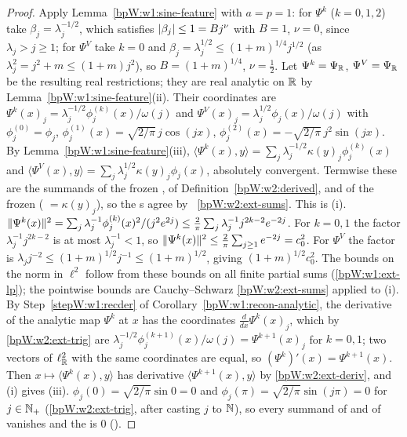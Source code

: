 \begin{proof}
\label{stepW:w2:features}
Apply Lemma~\ref{bpW:w1:sine-feature} with $a=p=1$: for $\Psi^k$ ($k=0,1,2$) take $\beta_j=\lambda_j^{-1/2}$, which
satisfies $\lvert \beta_j\rvert\le1=Bj^\nu$ with $B=1$, $\nu=0$, since $\lambda_j>j\ge1$; for $\Psi^V$ take $k=0$ and
$\beta_j=\lambda_j^{1/2}\le(1+m)^{1/4}j^{1/2}$ (as $\lambda_j^2=j^2+m\le(1+m)j^2$), so $B=(1+m)^{1/4}$, $\nu=\frac12$.
Let $\Psi^k=\Psi_{\mathbb{R}}$, $\Psi^V=\Psi_{\mathbb{R}}$ be the resulting real restrictions; they are real analytic on $\mathbb{R}$ by
Lemma~\ref{bpW:w1:sine-feature}(ii). Their coordinates are
$\Psi^k(x)_j=\lambda_j^{-1/2}\phi^{(k)}_j(x)/\omega(j)$ and $\Psi^V(x)_j=\lambda_j^{1/2}\phi_j(x)/\omega(j)$ with
$\phi^{(0)}_j=\phi_j$, $\phi^{(1)}_j(x)=\sqrt{2/\pi}\,j\cos(jx)$, $\phi^{(2)}_j(x)=-\sqrt{2/\pi}\,j^2\sin(jx)$.
\label{stepW:w2:pairing}
By Lemma~\ref{bpW:w1:sine-feature}(iii), $\langle\Psi^k(x),y\rangle=\sum_j\lambda_j^{-1/2}\kappa(y)_j\phi^{(k)}_j(x)$
and $\langle\Psi^V(x),y\rangle=\sum_j\lambda_j^{1/2}\kappa(y)_j\phi_j(x)$, absolutely convergent. Termwise these are
the summands of the frozen , of Definition~\ref{bpW:w2:derived}, and of the frozen 
( $=\kappa(y)_j$), so the s agree by ~\ref{bpW:w2:ext-sums}. This is (i).
\label{stepW:w2:norms}
$\lVert \Psi^k(x)\rVert^2=\sum_j\lambda_j^{-1}\phi^{(k)}_j(x)^2/(j^2e^{2j})\le\frac2\pi\sum_j\lambda_j^{-1}j^{2k-2}e^{-2j}$.
For $k=0,1$ the factor $\lambda_j^{-1}j^{2k-2}$ is at most $\lambda_j^{-1}<1$, so $\lVert \Psi^k(x)\rVert^2\le\frac2\pi
\sum_{j\ge1}e^{-2j}=c_0^2$. For $\Psi^V$ the factor is $\lambda_jj^{-2}\le(1+m)^{1/2}j^{-1}\le(1+m)^{1/2}$, giving
$(1+m)^{1/2}c_0^2$. The bounds on the norm in $\ell^2$ follow from these bounds on all finite partial sums
(\ref{bpW:w1:ext-lp}); the pointwise bounds are Cauchy--Schwarz \ref{bpW:w2:ext-sums} applied to (i).
\label{stepW:w2:xder}
By Step~\ref{stepW:w1:recder} of Corollary~\ref{bpW:w1:recon-analytic}, the derivative of the analytic map
$\Psi^k$ at $x$ has the coordinates $\frac{d}{dx}\Psi^k(x)_j$, which by \ref{bpW:w2:ext-trig} are
$\lambda_j^{-1/2}\phi^{(k+1)}_j(x)/\omega(j)=\Psi^{k+1}(x)_j$ for $k=0,1$; two vectors of $\ell^2_{\mathbb{R}}$ with the same
coordinates are equal, so $(\Psi^k)'(x)=\Psi^{k+1}(x)$. Then $x\mapsto\langle\Psi^k(x),y\rangle$ has derivative
$\langle\Psi^{k+1}(x),y\rangle$ by \ref{bpW:w2:ext-deriv}, and (i) gives (iii).
\label{stepW:w2:bdry}
$\phi_j(0)=\sqrt{2/\pi}\sin0=0$ and $\phi_j(\pi)=\sqrt{2/\pi}\sin(j\pi)=0$ for $j\in\mathbb{N}_+$ (\ref{bpW:w2:ext-trig}, after
casting $j$ to $\mathbb{N}$), so every summand of  and of  vanishes and the
 is $0$ ().
\end{proof}

